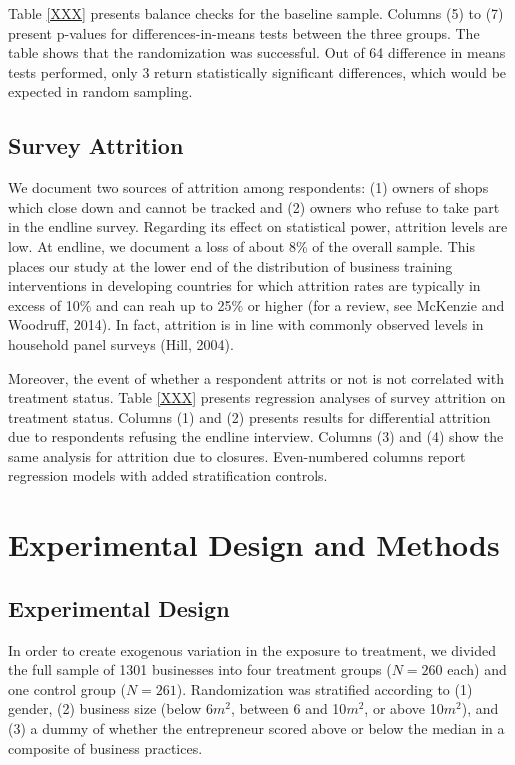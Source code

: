 \documentclass[11.5pt]{article}
\begin{document}
{Table \ref{XXX} presents balance checks for the baseline sample. Columns (5) to (7) present p-values for differences-in-means tests between the three groups. The table shows that the randomization was successful. Out of 64 difference in means tests performed, only 3 return statistically significant differences, which would be expected in random sampling.

\subsection{Survey Attrition}

We document two sources of attrition among respondents: (1) owners of shops which close down and cannot be tracked and (2) owners who refuse to take part in the endline survey. Regarding its effect on statistical power, attrition levels are low. At endline, we document a loss of about 8\% of the overall sample. This places our study at the lower end of the distribution of business training interventions in developing countries for which attrition rates are typically in excess of 10\% and can reah up to 25\% or higher (for a review, see McKenzie and Woodruff, 2014). In fact, attrition is in line with commonly observed levels in household panel surveys (Hill, 2004).

Moreover, the event of whether a respondent attrits or not is not correlated with treatment status. Table \ref{XXX} presents regression analyses of survey attrition on treatment status. Columns (1) and (2) presents results for differential attrition due to respondents refusing the endline interview. Columns (3) and (4) show the same analysis for attrition due to closures. Even-numbered columns report regression models with added stratification controls.


\section{\textbf{Experimental Design and Methods}}

\subsection{Experimental Design}

In order to create exogenous variation in the exposure to treatment, we divided the full sample of 1301 businesses into four treatment groups ($N = 260$ each) and one control group ($N = 261$). Randomization was stratified according to (1) gender, (2) business size (below 6$m^2$, between 6 and 10$m^2$, or above 10$m^2$), and (3) a dummy of whether the entrepreneur scored above or below the median in a composite of business practices.

}
\end{document}
